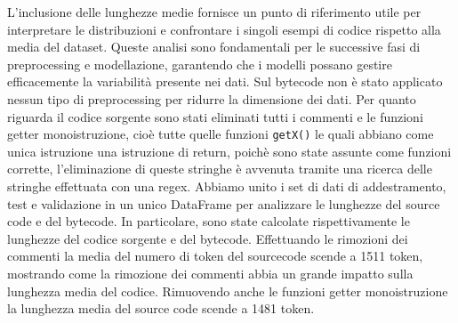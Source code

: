 \documentclass[../../Thesis.tex]{subfiles}
\begin{document}
L'inclusione delle lunghezze medie fornisce un punto di riferimento utile per interpretare le distribuzioni e confrontare i singoli esempi di codice rispetto alla media del dataset. Queste analisi sono fondamentali per le successive fasi di preprocessing e modellazione, garantendo che i modelli possano gestire efficacemente la variabilità presente nei dati.
Sul bytecode non è stato applicato nessun tipo di preprocessing per ridurre la dimensione dei dati. Per quanto riguarda il codice sorgente sono stati eliminati tutti i commenti e le funzioni getter monoistruzione, cioè tutte quelle funzioni \texttt{getX()} le quali abbiano come unica istruzione una istruzione di return, poichè sono state assunte come funzioni corrette, l'eliminazione di queste stringhe è avvenuta tramite una ricerca delle stringhe effettuata con una regex.
Abbiamo unito i set di dati di addestramento, test e validazione in un unico DataFrame per analizzare le lunghezze del source code e del bytecode. In particolare, sono state calcolate rispettivamente le lunghezze del codice sorgente e del bytecode. Effettuando le rimozioni dei commenti la media del numero di token del sourcecode scende a 1511 token, mostrando come la rimozione dei commenti abbia un grande impatto sulla lunghezza media del codice. Rimuovendo anche le funzioni getter monoistruzione la lunghezza media del source code scende a 1481 token.
\end{document}
